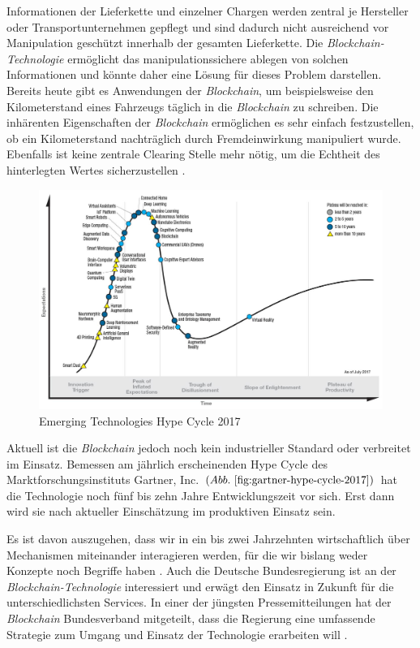 Informationen der Lieferkette und einzelner Chargen werden zentral je Hersteller oder Transportunternehmen gepflegt und sind dadurch nicht ausreichend vor Manipulation geschützt innerhalb der gesamten Lieferkette. Die \textit{Blockchain-Technologie} ermöglicht das manipulationssichere ablegen von solchen Informationen und könnte daher eine Lösung für dieses Problem darstellen. Bereits heute gibt es Anwendungen der \textit{Blockchain}, um beispielsweise den Kilometerstand eines Fahrzeugs täglich \glqq in die \textit{Blockchain}\grqq{} zu schreiben. Die inhärenten Eigenschaften der \textit{Blockchain} ermöglichen es sehr einfach festzustellen, ob ein Kilometerstand nachträglich durch Fremdeinwirkung manipuliert wurde. Ebenfalls ist keine zentrale \glqq Clearing Stelle\grqq{} mehr nötig, um die Echtheit des hinterlegten Wertes sicherzustellen \citep{carVertical}.

\begin{figure}[H]
	\centering
	\includegraphics[width=1.0\linewidth]{pictures/Gartner-Hype-Cycle-2017}
	\caption[Gartner Hype Cycle 2017]{Emerging Technologies Hype Cycle 2017\citep{Gartner2017}}
	\label{fig:gartner-hype-cycle-2017}
\end{figure}

Aktuell ist die \textit{Blockchain} jedoch noch kein industrieller Standard oder verbreitet im Einsatz. Bemessen am jährlich erscheinenden Hype Cycle des Marktforschungsinstituts Gartner, Inc. $( Abb.~ \ref{fig:gartner-hype-cycle-2017} )$ hat die Technologie noch fünf bis zehn Jahre Entwicklungszeit vor sich. Erst dann wird sie nach aktueller Einschätzung im produktiven Einsatz sein.

\glqq Es ist davon auszugehen, dass wir in ein bis zwei Jahrzehnten wirtschaftlich über Mechanismen miteinander interagieren werden, für die wir bislang weder Konzepte noch Begriffe haben\grqq{} \citep[S.~92]{Platzer2014}.
Auch die Deutsche Bundesregierung ist an der \textit{Blockchain-Technologie} interessiert und erwägt den Einsatz in Zukunft für die unterschiedlichsten Services. In einer der jüngsten Pressemitteilungen hat der \textit{Blockchain} Bundesverband mitgeteilt, dass die Regierung eine umfassende Strategie zum Umgang und Einsatz der Technologie erarbeiten will \citep{BCBundesverband2018}.

